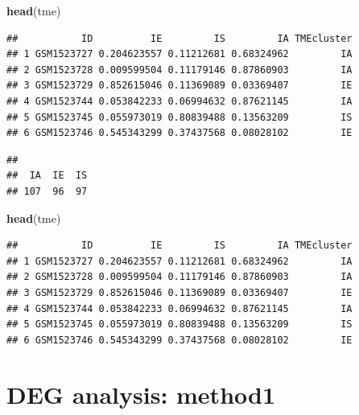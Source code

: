 \documentclass[
  12pt,
]{book}
\newenvironment{Shaded}{\begin{snugshade}}{\end{snugshade}}
\newcommand{\FunctionTok}[1]{\textcolor[rgb]{0.13,0.29,0.53}{\textbf{#1}}}
\newcommand{\NormalTok}[1]{#1}
\newcommand{\SpecialCharTok}[1]{\textcolor[rgb]{0.81,0.36,0.00}{\textbf{#1}}}
\begin{document}
\begin{Shaded}
\begin{Highlighting}[]
\FunctionTok{head}\NormalTok{(tme)}
\end{Highlighting}
\end{Shaded}

\begin{verbatim}
##           ID          IE         IS         IA TMEcluster
## 1 GSM1523727 0.204623557 0.11212681 0.68324962         IA
## 2 GSM1523728 0.009599504 0.11179146 0.87860903         IA
## 3 GSM1523729 0.852615046 0.11369089 0.03369407         IE
## 4 GSM1523744 0.053842233 0.06994632 0.87621145         IA
## 5 GSM1523745 0.055973019 0.80839488 0.13563209         IS
## 6 GSM1523746 0.545343299 0.37437568 0.08028102         IE
\end{verbatim}

\begin{Shaded}
\end{Shaded}

\begin{verbatim}
## 
##  IA  IE  IS 
## 107  96  97
\end{verbatim}

\begin{Shaded}
\begin{Highlighting}[]
\FunctionTok{head}\NormalTok{(tme)}
\end{Highlighting}
\end{Shaded}

\begin{verbatim}
##           ID          IE         IS         IA TMEcluster
## 1 GSM1523727 0.204623557 0.11212681 0.68324962         IA
## 2 GSM1523728 0.009599504 0.11179146 0.87860903         IA
## 3 GSM1523729 0.852615046 0.11369089 0.03369407         IE
## 4 GSM1523744 0.053842233 0.06994632 0.87621145         IA
## 5 GSM1523745 0.055973019 0.80839488 0.13563209         IS
## 6 GSM1523746 0.545343299 0.37437568 0.08028102         IE
\end{verbatim}

\hypertarget{deg-analysis-method1}{%
\section{DEG analysis: method1}\label{deg-analysis-method1}}
\end{document}
